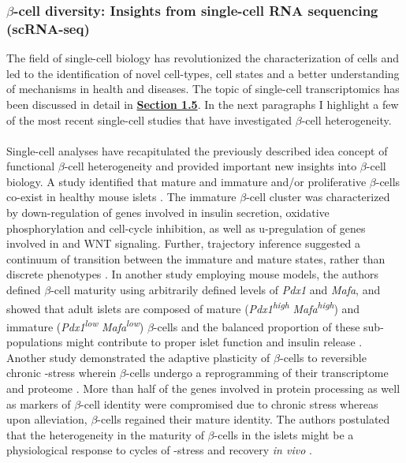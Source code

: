 
\subsubsection{$\beta$-cell diversity: Insights from single-cell RNA sequencing (scRNA-seq)}
The field of single-cell biology has revolutionized the characterization of cells and led to the identification of novel cell-types, cell states and a better understanding of mechanisms in health and diseases. The topic of single-cell transcriptomics has been discussed in detail in \textbf{\hyperref[sec:scrna]{Section 1.5}}. In the next paragraphs I highlight a few of the most recent single-cell studies that have investigated $\beta$-cell heterogeneity.\\\\ 
Single-cell analyses have recapitulated the previously described idea concept of functional $\beta$-cell heterogeneity and provided important new insights into $\beta$-cell biology. A study identified that mature and immature and/or proliferative $\beta$-cells co-exist in healthy mouse islets \textbf{\cite{sachs_targeted_2020}}. The immature $\beta$-cell cluster was characterized by down-regulation of genes involved in insulin secretion, oxidative phosphorylation and cell-cycle inhibition, as well as u-pregulation of genes involved in  and WNT signaling. Further, trajectory inference %
suggested a continuum of transition between the immature and mature states, rather than discrete phenotypes \textbf{\cite{sachs_targeted_2020}}. In another study employing mouse models, the authors defined $\beta$-cell maturity using arbitrarily defined levels of \textit{Pdx1} and \textit{Mafa}, and showed that adult islets are composed of mature (\textit{Pdx1}\textsuperscript{\textit{high}} \textit{Mafa}\textsuperscript{\textit{high}}) and immature (\textit{Pdx1}\textsuperscript{\textit{low}} \textit{Mafa}\textsuperscript{\textit{low}}) $\beta$-cells and the balanced proportion of these sub-populations might contribute to proper islet function and insulin release \textbf{\cite{nasteska_pdx1low_2021}}. Another study demonstrated the adaptive plasticity of $\beta$-cells to reversible chronic -stress wherein $\beta$-cells undergo a reprogramming of their transcriptome and proteome \textbf{\cite{chen_adaptation_2022}}. More than half of the genes involved in  protein processing as well as markers of $\beta$-cell identity were compromised due to chronic stress whereas upon alleviation, $\beta$-cells regained their mature identity. The authors postulated that the heterogeneity in the maturity of $\beta$-cells in the islets might be a physiological response to cycles of -stress and recovery \textit{in vivo} \textbf{\cite{chen_adaptation_2022}}.\\\\
